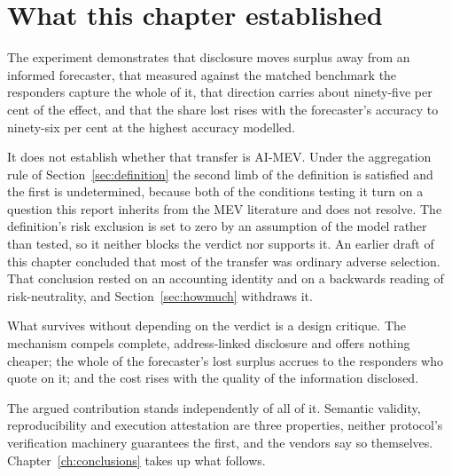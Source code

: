 \section{What this chapter established}

The experiment demonstrates that disclosure moves surplus away from an informed forecaster,
that measured against the matched benchmark the responders capture the whole of it, that
direction carries about ninety-five per cent of the effect, and that the share lost rises
with the forecaster's accuracy to ninety-six per cent at the highest accuracy modelled.

It does not establish whether that transfer is AI-MEV. Under the aggregation rule of
Section~\ref{sec:definition} the second limb of the definition is satisfied and the first is
undetermined, because both of the conditions testing it turn on a question this report
inherits from the MEV literature and does not resolve. The definition's risk exclusion is
set to zero by an assumption of the model rather than tested, so it neither blocks the
verdict nor supports it. An
earlier draft of this chapter concluded that most of the transfer was ordinary adverse
selection. That conclusion rested on an accounting identity and on a backwards reading of
risk-neutrality, and Section~\ref{sec:howmuch} withdraws it.

What survives without depending on the verdict is a design critique. The mechanism compels
complete, address-linked disclosure and offers nothing cheaper; the whole of the forecaster's
lost surplus accrues to the responders who quote on it; and the cost rises with the quality
of the information disclosed.

The argued contribution stands independently of all of it. Semantic validity,
reproducibility and execution attestation are three properties, neither protocol's verification
machinery guarantees the first, and the vendors say so themselves.
Chapter~\ref{ch:conclusions} takes up what follows.
